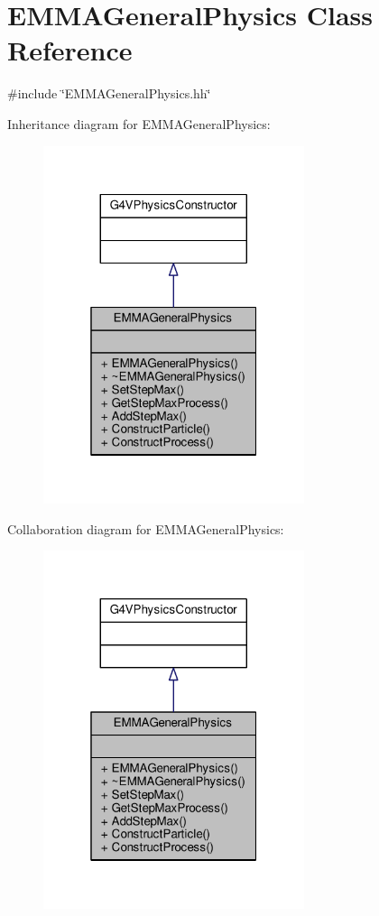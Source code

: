 \hypertarget{classEMMAGeneralPhysics}{}\section{E\+M\+M\+A\+General\+Physics Class Reference}
\label{classEMMAGeneralPhysics}


{\ttfamily \#include \char`\"{}E\+M\+M\+A\+General\+Physics.\+hh\char`\"{}}



Inheritance diagram for E\+M\+M\+A\+General\+Physics\+:
\nopagebreak
\begin{figure}[H]
\begin{center}
\leavevmode
\includegraphics[width=217pt]{classEMMAGeneralPhysics__inherit__graph}
\end{center}
\end{figure}


Collaboration diagram for E\+M\+M\+A\+General\+Physics\+:
\nopagebreak
\begin{figure}[H]
\begin{center}
\leavevmode
\includegraphics[width=217pt]{classEMMAGeneralPhysics__coll__graph}
\end{center}
\end{figure}
